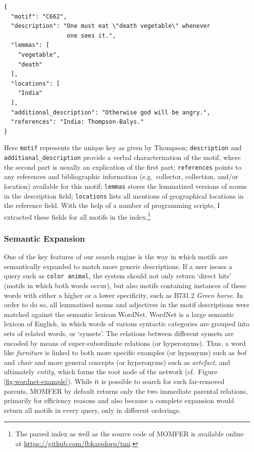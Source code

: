 \begin{verbatim}
{
  "motif": "C662", 
  "description": "One must eat \"death vegetable\" whenever 
                  one sees it.", 
  "lemmas": [
    "vegetable", 
    "death"
  ], 
  "locations": [
    "India"
  ], 
  "additional_description": "Otherwise god will be angry.", 
  "references": "India: Thompson-Balys."
}
\end{verbatim}

\noindent Here \texttt{motif} represents the unique key as given by Thompson; \texttt{description} and \texttt{additional\_description} provide a verbal characterization of the motif, where the second part is usually an explication of the first part; \texttt{references} points to any references and bibliographic information (e.g.\ collector, collection, and/or location) available for this motif; \texttt{lemmas} stores the lemmatized versions of nouns in the description field; \texttt{locations} lists all mentions of geographical locations in the reference field. With the help of a number of programming scripts, I extracted these fields for all motifs in the index.\footnote{The parsed index as well as the source code of MOMFER is available online at \url{https://github.com/fbkarsdorp/tmi}.}

\subsubsection{Semantic Expansion}

One of the key features of our search engine is the way in which motifs are semantically expanded to match more generic descriptions. If a user issues a query such as \texttt{color animal}, the system should not only return `direct hits' (motifs in which both words occur), but also motifs containing instances of these words with either a higher or a lower specificity, such as B731.2 \emph{Green horse}. In order to do so, all lemmatized nouns and adjectives in the motif descriptions were matched against the semantic lexicon WordNet\autocite{fellbaum:2005}. WordNet is a large semantic lexicon of English, in which words of various syntactic categories are grouped into sets of related words, or `synsets'.\autocite[While there has been some criticism of the usefulness and limitations of WordNet, our case studies show that, for the purposes of this research tool, synsets and WordNet are in fact valuable methods that improve the retrieval results, cf.][]{wilks:1996,lenat:1995} The relations between different synsets are encoded by means of super-subordinate relations (or hyperonyms). Thus, a word like \emph{furniture} is linked to both more specific examples (or hyponyms) such as \emph{bed} and \emph{chair} and more general concepts (or hyperonyms) such as \emph{artefact}, and ultimately \emph{entity}, which forms the root node of the network (cf.\ Figure \ref{fig:wordnet-example}). While it is possible to search for such far-removed parents, MOMFER by default returns only the two immediate parental relations, primarily for efficiency reasons and also because a complete expansion would return all motifs in every query, only in different orderings.

